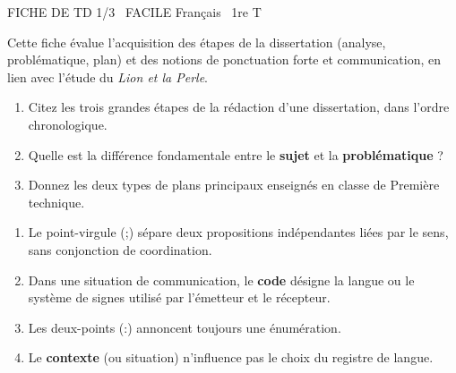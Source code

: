 \documentclass[11pt]{article}
\begin{document}
\begin{tcolorbox}[enhanced,colback=popink,colframe=popink,arc=10pt,boxrule=0pt,left=12pt,right=12pt,top=9pt,bottom=9pt]
{\color{white}\popxbold\small FICHE DE TD 1/3 \textbullet\ FACILE \hfill Français \textbullet\ 1re T\par}
\end{tcolorbox}
\vspace{4pt}
\noindent Cette fiche évalue l'acquisition des étapes de la dissertation (analyse, problématique, plan) et des notions de ponctuation forte et communication, en lien avec l'étude du \textit{Lion et la Perle}.

\begin{exercice}
\begin{enumerate}
    \item Citez les trois grandes étapes de la rédaction d'une dissertation, dans l'ordre chronologique.
    \item Quelle est la différence fondamentale entre le \textbf{sujet} et la \textbf{problématique} ?
    \item Donnez les deux types de plans principaux enseignés en classe de Première technique.
\end{enumerate}
\end{exercice}

\begin{exercice}
\begin{enumerate}
    \item Le point-virgule (;) sépare deux propositions indépendantes liées par le sens, sans conjonction de coordination.
    \item Dans une situation de communication, le \textbf{code} désigne la langue ou le système de signes utilisé par l'émetteur et le récepteur.
    \item Les deux-points (:) annoncent toujours une énumération.
    \item Le \textbf{contexte} (ou situation) n'influence pas le choix du registre de langue.
\end{enumerate}
\end{exercice}
\end{document}
